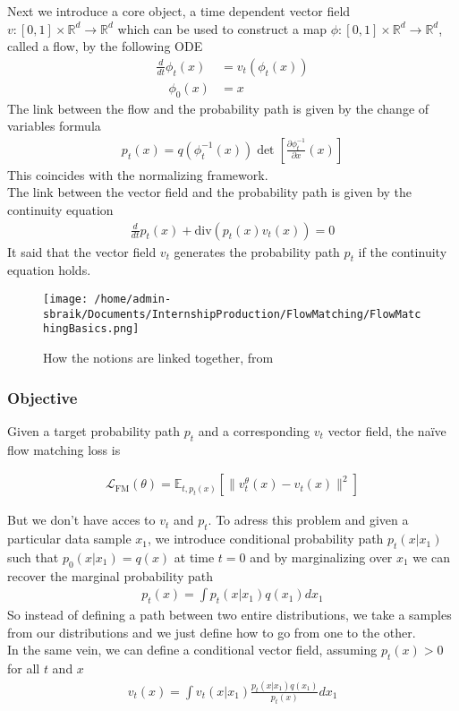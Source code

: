 \documentclass{article}
\begin{document}
\newpage

Next we introduce a core object, a time dependent vector field \(v:[0,1]\times \mathbb{R}^d\rightarrow\mathbb{R}^d\) which can be used to construct a map \(\phi:[0,1]\times\mathbb{R}^d\rightarrow\mathbb{R}^d\), called a flow, by the following ODE
\begin{align}
    \frac{d}{dt}\phi_t(x)&=v_t(\phi_t(x))\\
    \quad \phi_0(x)&=x \nonumber
\end{align}  
The link between the flow and the probability path is given by the change of variables formula 
\begin{align}
    p_t(x)=q(\phi_t^{-1}(x))\det \left[\frac{\partial\phi_t^{-1}}{\partial x}(x)\right]
\end{align}
This coincides with the normalizing framework. \\
The link between the vector field and the probability path is given by the continuity equation 
\begin{align}
  \frac{d}{dt}p_t(x)+\text{div}(p_t(x)v_t(x))=0
\end{align}
It said that the vector field \(v_t\) generates the probability path \(p_t\) if the continuity equation holds.\\
\bigskip
\begin{figure}[h]
    \centering
    \texttt{[image: /home/admin-sbraik/Documents/InternshipProduction/FlowMatching/FlowMatchingBasics.png]}
    \caption{How the notions are linked together, from \cite{lipman2024flowmatchingguidecode}}
    \label{fig:flow_matching_basics}
\end{figure}

\subsubsection{Objective}
Given a target probability path \(p_t\) and a corresponding \(v_t\) vector field, the naïve flow matching loss is 

\begin{align}
    \mathcal{L}_\text{FM}(\theta) = \mathbb{E}_{t,p_t(x)}\left[\|v_t^\theta(x)-v_t(x)\|^2\right]
\end{align}

But we don't have acces to \(v_t\) and \(p_t\). To adress this problem and given a particular data sample \(x_1\), we introduce conditional probability path \(p_t(x|x_1)\) such that \(p_0(x|x_1)=q(x)\) at time \(t=0\) and by marginalizing over \(x_1\) we can recover the marginal probability path  
\begin{align}
  p_t(x)=\int p_t(x|x_1)q(x_1)dx_1
\end{align}
So instead of defining a path between two entire distributions, we take a samples from our distributions and we just define how to go from one to the other.\\ 
In the same vein, we can define a conditional vector field, assuming \(p_t(x)>0\) for all \(t\) and \(x\) 
\begin{align}
  v_t(x)=\int v_t(x|x_1)\frac{p_t(x|x_1)q(x_1)}{p_t(x)}dx_1
\end{align}
\end{document}
